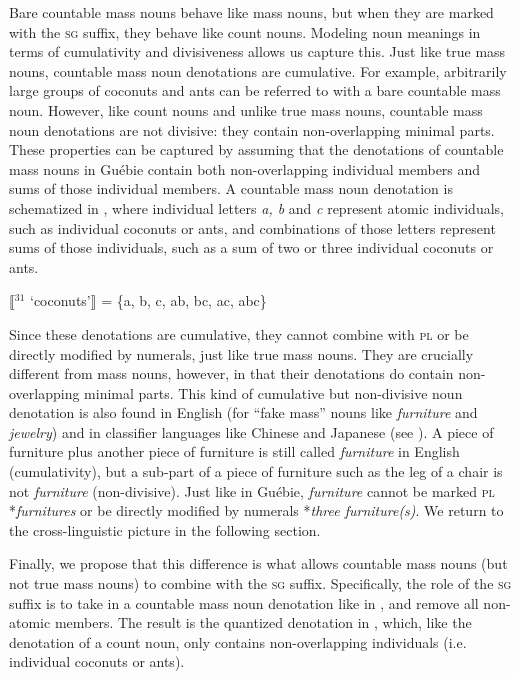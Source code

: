 \documentclass[output=paper,colorlinks,citecolor=brown]{langscibook}
\begin{document}
Bare countable mass nouns behave like mass nouns, but when they are marked with the \textsc{sg} suffix, they behave like count nouns. Modeling noun meanings in terms of cumulativity and divisiveness allows us capture this. Just like true mass nouns, countable mass noun denotations are cumulative. For example, arbitrarily large groups of coconuts and ants can be referred to with a bare countable mass noun. However, like count nouns and unlike true mass nouns, countable mass noun denotations are not divisive: they contain non-overlapping minimal parts. These properties can be captured by assuming that the denotations of countable mass nouns in Guébie contain both non-overlapping individual members and sums of those individual members. A countable mass noun denotation is schematized in , where individual letters \textit{a, b} and \textit{c} represent atomic individuals, such as individual coconuts or ants, and combinations of those letters represent sums of those individuals, such as a sum of two or three individual coconuts or ants.%

\ea%
    \label{ex:sande:19}
    $\llbracket$$^{31}$ `coconuts'$\rrbracket$ = \{a, b, c, ab, bc, ac, abc\}
\z

Since these denotations are cumulative, they cannot combine with \textsc{pl} or be directly modified by numerals, just like true mass nouns. They are crucially different from mass nouns, however, in that their denotations do contain non-overlapping minimal parts. This kind of cumulative but non-divisive noun denotation is also found in English (for ``fake mass'' nouns like \textit{furniture} and \textit{jewelry}) and in classifier languages like Chinese and Japanese (see \citealt{Doetjes1997, Landman2011, Deal2017}). A piece of furniture plus another piece of furniture is still called \emph{furniture} in English (cumulativity), but a sub-part of a piece of furniture such as the leg of a chair is not \emph{furniture} (non-divisive). Just like in Guébie, \textit{furniture} cannot be marked \textsc{pl} *\textit{furnitures} or be directly modified by numerals *\textit{three furniture(s)}. We return to the cross-linguistic picture in the following section.

Finally, we propose that this difference is what allows countable mass nouns (but not true mass nouns) to combine with the \textsc{sg} suffix. Specifically, the role of the \textsc{sg} suffix is to take in a countable mass noun denotation like in , and remove all non-atomic members. The result is the quantized denotation in , which, like the denotation of a count noun, only contains non-overlapping individuals (i.e. individual coconuts or ants).%
\end{document}
